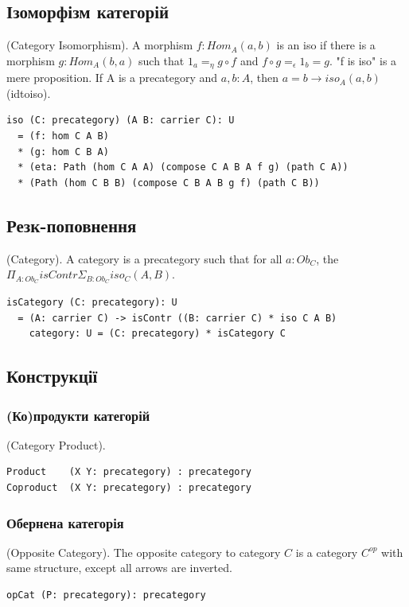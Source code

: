 \subsection{Ізоморфізм категорій}
\begin{definition} (Category Isomorphism).
A morphism $f : Hom_A(a,b)$ is an iso
if there is a morphism $g: Hom_A(b,a)$ such that
$1_a =_\eta g \circ f$ and
$f \circ g =_\epsilon 1_b = g$. "f is iso" is
a mere proposition.
If A is a precategory and $a,b: A$,
then $a = b \rightarrow iso_A(a,b)$ (idtoiso).
\begin{lstlisting}
iso (C: precategory) (A B: carrier C): U
  = (f: hom C A B)
  * (g: hom C B A)
  * (eta: Path (hom C A A) (compose C A B A f g) (path C A))
  * (Path (hom C B B) (compose C B A B g f) (path C B))
\end{lstlisting}
\end{definition}

\subsection{Резк-поповнення}
\begin{definition} (Category).
A category is a precategory
such that for all $a:Ob_C$, the $\Pi_{A:Ob_C} isContr \Sigma_{B:Ob_C} iso_C(A,B)$.
\begin{lstlisting}
isCategory (C: precategory): U
  = (A: carrier C) -> isContr ((B: carrier C) * iso C A B)
    category: U = (C: precategory) * isCategory C
\end{lstlisting}
\end{definition}

\subsection{Конструкції}

\subsubsection{(Ко)продукти категорій}
\begin{definition} (Category Product).
\begin{lstlisting}
Product    (X Y: precategory) : precategory
Coproduct  (X Y: precategory) : precategory
\end{lstlisting}
\end{definition}

\subsubsection{Обернена категорія}
\begin{definition} (Opposite Category). The opposite category to category $C$
is a category $C^{op}$ with same structure, except all arrows are inverted.
\begin{lstlisting}
opCat (P: precategory): precategory
\end{lstlisting}
\end{definition}


